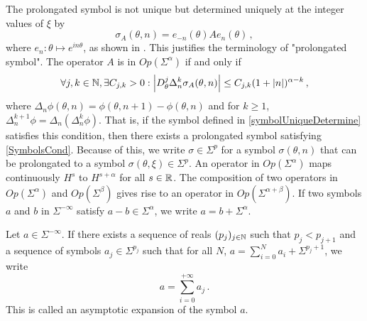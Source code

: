 \documentclass[a4paper]{article}
\begin{document}
The prolongated symbol is not unique but determined uniquely at the integer values of $\xi$ by 
\begin{equation}
	\label{symbolUniqueDetermine}
	\sigma_A(\theta,n) =  e_{-n}(\theta)Ae_n(\theta)\,,
\end{equation}
where $e_n : \theta \mapsto e^{in\theta}$, as shown in \cite{thrunen1998symbol}. This justifies the terminology of "prolongated symbol". The operator $A$ is in $\textit{Op}(\Sigma^\alpha)$ if and only if
\[\forall j,k \in \mathbb{N}, \exists C_{j,k} > 0 : \left\lvert D_\theta^j \Delta_n^k \sigma_A(\theta,n) \right\rvert \leq C_{j,k}(1 + \left\lvert n \right\rvert)^{\alpha - k}\,,\] 
where $\Delta_n \phi(\theta,n) = \phi(\theta,n+1) - \phi(\theta,n)$ and for $k \geq 1$, $\Delta^{k+1}_n\phi = \Delta_n (\Delta^k_n \phi)$. That is, if the symbol defined in \eqref{symbolUniqueDetermine} satisfies this condition, then there exists a prolongated symbol satisfying \eqref{SymbolsCond}. Because of this, we write $\sigma \in \Sigma^p$ for a symbol $\sigma(\theta,n)$ that can be prolongated to a symbol ${\sigma}(\theta,\xi) \in \Sigma^p$. An operator in $\textit{Op}(\Sigma^\alpha)$ maps continuously $H^s$ to $H^{s + \alpha}$ for all $s \in \mathbb{R}$. The composition of two operators in $\textit{Op}(\Sigma^\alpha)$ and $\textit{Op}(\Sigma^\beta)$ gives rise to an operator in $\textit{Op}(\Sigma^{\alpha+\beta})$. 
If two symbols $a$ and $b$ in $\Sigma^{- \infty}$ satisfy $a - b  \in \Sigma^{\alpha}$, we write $a = b + \Sigma^\alpha$. 
\begin{Def}
	Let $a \in \Sigma^{- \infty}$. If there exists a sequence of reals $(p_j)_{j \in \mathbb{N}}$ such that $p_j < p_{j+1}$ and a sequence of symbols $a_j \in \Sigma^{p_j}$ such that for all $N$, $a = \sum_{i = 0}^{N}a_i + \Sigma^{p_j + 1}$, we write 
	\[a = \sum_{i = 0}^{+ \infty} a_j \,.\]
	This is called an asymptotic expansion of the symbol $a$. 
\end{Def}
\end{document}
